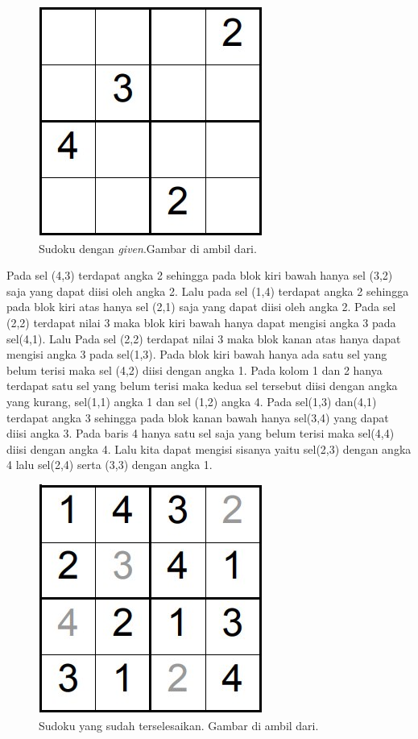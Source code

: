 \begin{figure}[H]
	\begin{centering}
		\includegraphics[scale=0.7]{gambar/4x4.jpeg}
		
		\caption{Sudoku dengan \textit{given}.Gambar di ambil dari.}
	\end{centering}
\end{figure}

Pada sel (4,3) terdapat angka 2 sehingga pada blok kiri bawah hanya sel (3,2) saja yang dapat diisi oleh angka 2. Lalu pada sel (1,4) terdapat angka 2 sehingga pada blok kiri atas hanya sel (2,1) saja yang dapat diisi oleh angka 2. Pada sel (2,2) terdapat nilai 3 maka blok kiri bawah hanya dapat mengisi angka 3 pada sel(4,1). Lalu Pada sel (2,2) terdapat nilai 3 maka blok kanan atas hanya dapat mengisi angka 3 pada sel(1,3). Pada blok kiri bawah hanya ada satu sel yang belum terisi maka sel (4,2) diisi dengan angka 1. Pada kolom 1 dan 2 hanya terdapat satu sel yang belum terisi maka kedua sel tersebut diisi dengan angka yang kurang, sel(1,1) angka 1 dan sel (1,2) angka 4. Pada sel(1,3) dan(4,1) terdapat angka 3 sehingga pada blok kanan bawah hanya sel(3,4) yang dapat diisi angka 3. Pada baris 4 hanya satu sel saja yang belum terisi maka sel(4,4) diisi dengan angka 4. Lalu kita dapat mengisi sisanya yaitu sel(2,3) dengan angka 4 lalu sel(2,4) serta (3,3) dengan angka 1.

\begin{figure}[H]
	\begin{centering}
		\includegraphics[scale=0.7]{gambar/4x4solved.jpeg}
		
		\caption{Sudoku yang sudah terselesaikan. Gambar di ambil dari.}
	\end{centering}
\end{figure}

